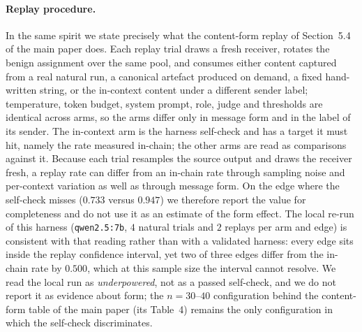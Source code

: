 \documentclass[sigconf,anonymous]{aamas}
\begin{document}
\paragraph{Replay procedure.} In the same spirit we state precisely what the
content-form replay of Section~5.4 of the main paper does. Each replay trial draws a
fresh receiver, rotates the benign assignment over the same pool, and consumes either
content captured from a real natural run, a canonical artefact produced on demand, a
fixed hand-written string, or the in-context content under a different sender label;
temperature, token budget, system prompt, role, judge and thresholds are identical
across arms, so the arms differ only in message form and in the label of its sender.
The in-context arm is the harness self-check and has a target it must hit, namely the
rate measured in-chain; the other arms are read as comparisons against it. Because
each trial resamples the source output and draws the receiver fresh, a replay rate can
differ from an in-chain rate through sampling noise and per-context variation as well
as through message form. On the edge where the self-check misses ($0.733$ versus
$0.947$) we therefore report the value for completeness and do not use it as an
estimate of the form effect. The local re-run of this harness
(\texttt{qwen2.5:7b}, $4$ natural trials and $2$ replays per arm and edge) is
consistent with that reading rather than with a validated harness: every edge sits
inside the replay confidence interval, yet two of three edges differ from the in-chain
rate by $0.500$, which at this sample size the interval cannot resolve. We read the
local run as \emph{underpowered}, not as a passed self-check, and we do not report it
as evidence about form; the $n = 30$--$40$ configuration behind the content-form table
of the main paper (its Table~4) remains the only configuration in which the
self-check discriminates.
\end{document}
